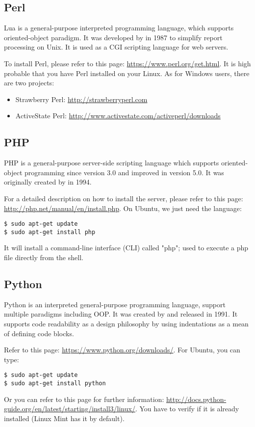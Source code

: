 \documentclass{KodeBook}
\begin{document}
\subsection{Perl}

Lua is a general-purpose interpreted programming language, which supports oriented-object paradigm. 
It was developed by  in 1987 to simplify report processing on Unix.
It is used as a CGI scripting language for web servers.

To install Perl, please refer to this page: \url{https://www.perl.org/get.html}. 
It is high probable that you have Perl installed on your Linux. 
As for Windows users, there are two projects: 
\begin{itemize}
	\item Strawberry Perl: \url{http://strawberryperl.com}
	\item ActiveState Perl: \url{http://www.activestate.com/activeperl/downloads}
\end{itemize}

\subsection{PHP}

PHP is a general-purpose server-side scripting language which supports oriented-object programming since version 3.0  and improved in version 5.0.
It was originally created by  in 1994. 

For a detailed description on how to install the server, please refer to this page: \url{http://php.net/manual/en/install.php}.
On Ubuntu, we just need the language:
\begin{lstlisting}[style=shellStyle]
$ sudo apt-get update
$ sudo apt-get install php
\end{lstlisting}
It will install a command-line interface (CLI) called "php"; used to execute a php file directly from the shell.

\subsection{Python}

Python is an interpreted general-purpose programming language, support multiple paradigms including OOP. 
It was created by  and released in 1991.
It supports code readability as a design philosophy by using indentations as a mean of defining code blocks.

Refer to this page: \url{https://www.python.org/downloads/}. 
For Ubuntu, you can type:
\begin{lstlisting}[style=shellStyle]
$ sudo apt-get update
$ sudo apt-get install python
\end{lstlisting}
Or you can refer to this page for further information: \url{http://docs.python-guide.org/en/latest/starting/install3/linux/}.
You have to verify if it is already installed (Linux Mint has it by default).
\end{document}
